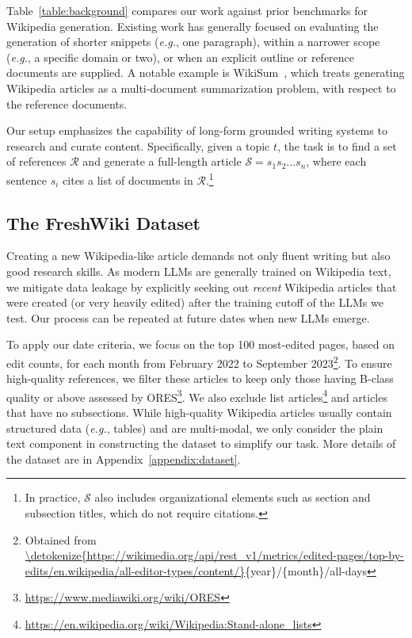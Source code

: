 \documentclass[11pt]{article}
\newcommand{\reftab}[1]{Table~\ref{#1}}
\def\eg{\textit{e.g.}\xspace}
\begin{document}
\reftab{table:background} compares our work against prior benchmarks for Wikipedia generation. Existing work has generally focused on evaluating the generation of shorter snippets (\eg, one paragraph), within a narrower scope (\eg, a specific domain or two), or when an explicit outline or reference documents are supplied. A notable example is WikiSum~\citep{j.2018generating}, which treats generating Wikipedia articles as a multi-document summarization problem, with respect to the reference documents. 

Our setup emphasizes the capability of long-form grounded writing systems to research and curate content. Specifically, given a topic $t$, the task is to find a set of references $\mathcal{R}$ and generate a full-length article $\mathcal{S}=s_1s_2...s_n$, where each sentence $s_i$ cites a list of documents in $\mathcal{R}$.\footnote{In practice, $\mathcal{S}$ also includes organizational elements such as section and subsection titles, which do not require citations.}






\subsection{The FreshWiki Dataset}
\label{sec:task_dataset}

Creating a new Wikipedia-like article demands not only fluent writing but also good research skills. As modern LLMs are generally trained on Wikipedia text, we mitigate data leakage by explicitly seeking out \textit{recent} Wikipedia articles that were created (or very heavily edited) after the training cutoff of the LLMs we test. Our process can be repeated at future dates when new LLMs emerge.

To apply our date criteria, we focus on the top 100 most-edited pages, based on edit counts, for each month from February 2022 to September 2023\footnote{Obtained from \url{\detokenize{https://wikimedia.org/api/rest_v1/metrics/edited-pages/top-by-edits/en.wikipedia/all-editor-types/content/}}\{year\}/\{month\}/all-days}. 
To ensure high-quality references, we filter these articles to keep only those having B-class quality or above assessed by ORES\footnote{\url{https://www.mediawiki.org/wiki/ORES}}. We also exclude list articles\footnote{\url{https://en.wikipedia.org/wiki/Wikipedia:Stand-alone_lists}} and articles that have no subsections. While high-quality Wikipedia articles usually contain structured data (\eg, tables) and are multi-modal, we only consider the plain text component in constructing the dataset to simplify our task. More details of the dataset are in Appendix~\ref{appendix:dataset}.
\end{document}
